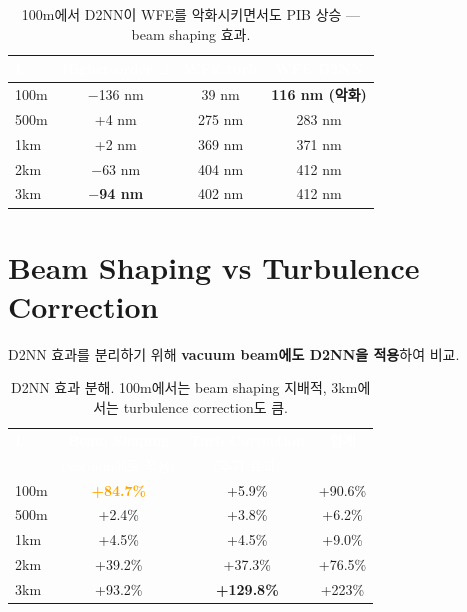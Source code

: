\documentclass[11pt,a4paper]{article}
\newcommand{\good}[1]{\textcolor{greengood}{\textbf{#1}}}
\newcommand{\bad}[1]{\textcolor{redwarn}{\textbf{#1}}}
\newcommand{\warn}[1]{\textcolor{orange}{\textbf{#1}}}
\begin{document}
\begin{table}[H]
\centering
\begin{tabular}{lccc}
\toprule
\rowcolor{tableheader}\textcolor{white}{\textbf{L}} & \textcolor{white}{\textbf{Higher-order $\Delta$}} & \textcolor{white}{\textbf{WFE turb}} & \textcolor{white}{\textbf{WFE D2NN}} \\
\midrule
100m & $-$136 nm & 39 nm & \bad{116 nm (악화)} \\
\rowcolor{tablealt}500m & +4 nm & 275 nm & 283 nm \\
1km & +2 nm & 369 nm & 371 nm \\
\rowcolor{tablealt}2km & $-$63 nm & 404 nm & 412 nm \\
3km & \good{$-$94 nm} & 402 nm & 412 nm \\
\bottomrule
\end{tabular}
\caption{100m에서 D2NN이 WFE를 악화시키면서도 PIB 상승 --- beam shaping 효과.}
\end{table}


\section{Beam Shaping vs Turbulence Correction}

D2NN 효과를 분리하기 위해 \textbf{vacuum beam에도 D2NN을 적용}하여 비교.

\begin{table}[H]
\centering\small
\begin{tabular}{l c c c}
\toprule
\rowcolor{tableheader}\textcolor{white}{\textbf{L}} & \textcolor{white}{\textbf{Beam Shaping}} & \textcolor{white}{\textbf{Turb Correction}} & \textcolor{white}{\textbf{합계}} \\
& \textcolor{white}{(vacuum에도 적용)} & \textcolor{white}{(추가 효과)} & \\
\midrule
100m & \warn{+84.7\%} & +5.9\% & +90.6\% \\
\rowcolor{tablealt}500m & +2.4\% & +3.8\% & +6.2\% \\
1km & +4.5\% & +4.5\% & +9.0\% \\
\rowcolor{tablealt}2km & +39.2\% & +37.3\% & +76.5\% \\
3km & +93.2\% & \good{+129.8\%} & +223\% \\
\bottomrule
\end{tabular}
\caption{D2NN 효과 분해. 100m에서는 beam shaping 지배적, 3km에서는 turbulence correction도 큼.}
\end{table}
\end{document}
